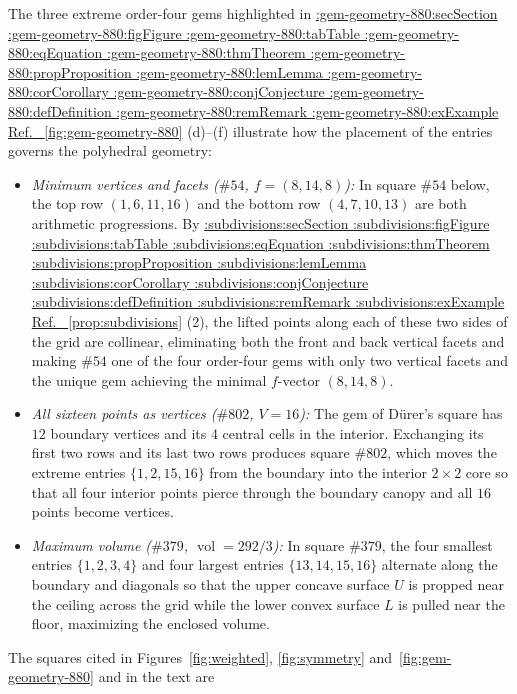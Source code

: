\documentclass[11pt,a4paper]{article}
\makeatletter
\def\Cref@getprefix#1:#2\relax{#1}
\def\Cref@prefix@sec{sec}
\def\Cref@prefix@fig{fig}
\def\Cref@prefix@tab{tab}
\def\Cref@prefix@eq{eq}
\def\Cref@prefix@thm{thm}
\def\Cref@prefix@prop{prop}
\def\Cref@prefix@lem{lem}
\def\Cref@prefix@cor{cor}
\def\Cref@prefix@conj{conj}
\def\Cref@prefix@def{def}
\def\Cref@prefix@rem{rem}
\def\Cref@prefix@ex{ex}
\def\Cref@type@cap#1{%
  \edef\Cref@tmp{#1}%
  \ifx\Cref@tmp\Cref@prefix@sec Section%
  \else\ifx\Cref@tmp\Cref@prefix@fig Figure%
  \else\ifx\Cref@tmp\Cref@prefix@tab Table%
  \else\ifx\Cref@tmp\Cref@prefix@eq Equation%
  \else\ifx\Cref@tmp\Cref@prefix@thm Theorem%
  \else\ifx\Cref@tmp\Cref@prefix@prop Proposition%
  \else\ifx\Cref@tmp\Cref@prefix@lem Lemma%
  \else\ifx\Cref@tmp\Cref@prefix@cor Corollary%
  \else\ifx\Cref@tmp\Cref@prefix@conj Conjecture%
  \else\ifx\Cref@tmp\Cref@prefix@def Definition%
  \else\ifx\Cref@tmp\Cref@prefix@rem Remark%
  \else\ifx\Cref@tmp\Cref@prefix@ex Example%
  \else Ref.%
  \fi\fi\fi\fi\fi\fi\fi\fi\fi\fi\fi\fi
}
\DeclareRobustCommand{\Cref}[1]{%
  \begingroup
  \edef\Cref@label{#1}%
  \edef\Cref@prefix{\expandafter\Cref@getprefix\Cref@label:\relax}%
  \hyperref[#1]{\Cref@type@cap{\Cref@prefix}~\ref*{#1}}%
  \endgroup
}
\theoremstyle{plain}
\theoremstyle{definition}
\theoremstyle{remark}
\makeatother
\begin{document}
The three extreme order-four gems highlighted in \Cref{fig:gem-geometry-880}(d)--(f) illustrate how the placement of the entries governs the polyhedral geometry:
\begin{itemize}\setlength\itemsep{1pt}
\item \emph{Minimum vertices and facets ($\#54$, $f=(8,14,8)$):} In square $\#54$ below, the top row $(1,6,11,16)$ and the bottom row $(4,7,10,13)$ are both arithmetic progressions. By \Cref{prop:subdivisions}(2), the lifted points along each of these two sides of the grid are collinear, eliminating both the front and back vertical facets and making $\#54$ one of the four order-four gems with only two vertical facets and the unique gem achieving the minimal $f$-vector $(8,14,8)$.
\item \emph{All sixteen points as vertices ($\#802$, $V=16$):} The gem of D\"urer's square has $12$ boundary vertices and its $4$ central cells in the interior. Exchanging its first two rows and its last two rows produces square $\#802$, which moves the extreme entries $\{1,2,15,16\}$ from the boundary into the interior $2\times2$ core so that all four interior points pierce through the boundary canopy and all $16$ points become vertices.
\item \emph{Maximum volume ($\#379$, $\operatorname{vol}=292/3$):} In square $\#379$, the four smallest entries $\{1,2,3,4\}$ and four largest entries $\{13,14,15,16\}$ alternate along the boundary and diagonals so that the upper concave surface $U$ is propped near the ceiling across the grid while the lower convex surface $L$ is pulled near the floor, maximizing the enclosed volume.
\end{itemize}
The squares cited in Figures~\ref{fig:weighted}, \ref{fig:symmetry} and~\ref{fig:gem-geometry-880} and in the text are
\end{document}

